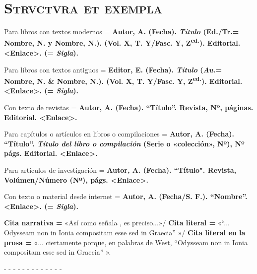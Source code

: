 \documentclass[11pt,twoside]{article}
\begin{document}
\section*{\centering\textsc{Strvctvra et exempla}}
Para libros con textos modernos = \textbf{Autor, A. (Fecha). \emph{Título} (Ed./Tr.= Nombre, N. y Nombre, N.). (Vol. X, T. Y/Fasc. Y, Z\textsuperscript{ed.}). Editorial. <Enlace>. (= \emph{Sigla}).}\par
%
Para libros con textos antiguos = \textbf{Editor, E. (Fecha). \emph{Título} (\emph{Au.}= Nombre, N. \& Nombre, N.). (Vol. X, T. Y/Fasc. Y, Z\textsuperscript{ed.}). Editorial. <Enlace>. (= \emph{Sigla}).}\par
%
Con texto de revistas = \textbf{Autor, A. (Fecha). ``Título''. Revista, Nº, páginas. Editorial. <Enlace>.}\par
%
Para capítulos o artículos en libros o compilaciones = \textbf{Autor, A. (Fecha). ``Título''. \emph{Título del libro o compilación} (Serie o «colección», Nº), Nº págs. Editorial. <Enlace>.}\par
%
Para artículos de investigación = \textbf{Autor, A. (Fecha). ``Título". Revista, Volúmen/Número (Nº), págs. <Enlace>.}\par
%
Con texto o material desde internet = \textbf{Autor, A. (Fecha/S. F.). ``Nombre''. <Enlace>. (= \emph{Sigla}).}\par
%
\vskip11pt
\textbf{Cita narrativa =} «Así como señala \textcite{west2017}, es preciso...»/ \textbf{Cita literal =} «``... Odysseam non in Ionia compositam esse sed in Graecia'' \parencite[VII]{west2017}»/ \textbf{Cita literal en la prosa =} «... ciertamente porque, en palabras de West, ``Odysseam non in Ionia compositam esse sed in Graecia'' ».\par
%
\noindent- - - - - - - - - - - - -\par
%
\nocite{*}
\printbibliography[heading=none]
\end{document}
